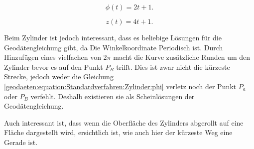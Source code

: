 \begin{equation}
	\phi(t) = 2t + 1 .
\end{equation}

\begin{equation}
	z(t) = 4t + 1 .
\end{equation}

Beim Zylinder ist jedoch interessant, dass es beliebige Lösungen für die Geodätengleichung gibt, da Die Winkelkoordinate Periodisch ist.
Durch Hinzufügen eines vielfachen von $2\pi$ macht die Kurve zusätzliche Runden um den Zylinder bevor es auf den Punkt $P_B$ trifft.
Dies ist zwar nicht die kürzeste Strecke, jedoch weder die Gleichung \ref{geodaeten:equation:Standardverfahren:Zylinder:phi} verletz noch der Punkt $P_a$ oder $P_B$ verfehlt.
Deshalb existieren sie als Scheinlösungen der Geodätengleichung.

Auch interessant ist, dass wenn die Oberfläche des Zylinders abgerollt auf eine Fläche dargestellt wird, ersichtlich ist, wie auch hier der kürzeste Weg eine Gerade ist. 

